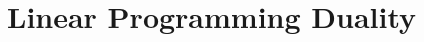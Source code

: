 \documentclass[main]{subfiles}
\begin{document}

\section{Linear Programming Duality}
\end{document}
